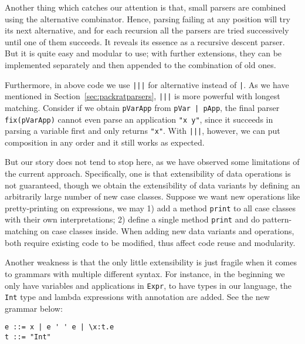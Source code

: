 Another thing which catches our attention is that, small parsers are combined using the alternative combinator. Hence, parsing failing at any position will try its next alternative, and for each recursion all the parsers are tried successively until one of them succeeds. It reveals its essence as a recursive descent parser. But it is quite easy and modular to use; with further extensions, they can be implemented separately and then appended to the combination of old ones.

Furthermore, in above code we use \lstinline{|||} for alternative instead of \lstinline{|}. As we have mentioned in Section~\ref{sec:packratparsers}, \lstinline{|||} is more powerful with longest matching. Consider if we obtain \lstinline{pVarApp} from \lstinline{pVar | pApp}, the final parser \lstinline{fix(pVarApp)} cannot even parse an application \lstinline{"x y"}, since it succeeds in parsing a variable first and only returns \lstinline{"x"}. With \lstinline{|||}, however, we can put composition in any order and it still works as expected.

But our story does not tend to stop here, as we have observed some limitations of the current approach. Specifically, one is that extensibility of data operations is not guaranteed, though we obtain the extensibility of data variants by defining an arbitrarily large number of new case classes. Suppose we want new operations like pretty-printing on expressions, we may 1) add a method \lstinline{print} to all case classes with their own interpretations; 2) define a single method \lstinline{print} and do pattern-matching on case classes inside. When adding new data variants and operations, both require existing code to be modified, thus affect code reuse and modularity.

Another weakness is that the only little extensibility is just fragile when it comes to grammars with multiple different syntax. For instance, in the beginning we only have variables and applications in \lstinline{Expr}, to have types in our language, the \lstinline{Int} type and lambda expressions with annotation are added. See the new grammar below:
\begin{lstlisting}
e ::= x | e ' ' e | \x:t.e
t ::= "Int"
\end{lstlisting}

